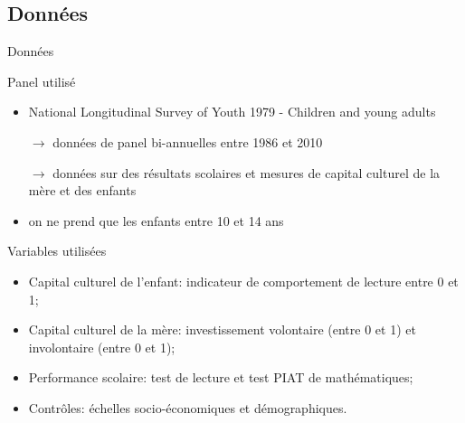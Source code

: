 \documentclass[9pt]{beamer}
\begin{document}
\subsection{Données}
\begin{frame}{Données}
	\begin{block}{Panel utilisé}
		\begin{itemize}
		\item National Longitudinal Survey of Youth 1979 - Children and young adults
		\item[$\to$] données de panel bi-annuelles entre 1986 et 2010
		\item[$\to$] données sur des résultats scolaires et mesures de capital culturel de la mère et des enfants
		\item on ne prend que les enfants entre 10 et 14 ans
		\end{itemize}
	\end{block}
	\begin{block}{Variables utilisées}
		\begin{itemize}
		\item Capital culturel de l'enfant: indicateur de comportement de lecture entre 0 et 1;
		\item Capital culturel de la mère: investissement volontaire (entre 0 et 1) et involontaire (entre 0 et 1);
		\item Performance scolaire: test de lecture et test PIAT de mathématiques;
		\item Contrôles: échelles socio-économiques et démographiques.
		\end{itemize}
	\end{block}
\end{frame}
\end{document}

